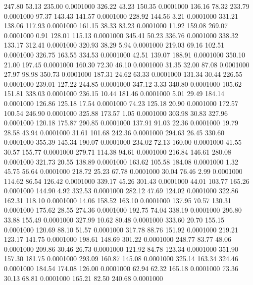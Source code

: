  247.80   53.13  235.00   0.0001000
 326.22   43.23  150.35   0.0001000
 136.16   78.32  233.79   0.0001000
  97.37  143.43  141.57   0.0001000
 228.92  144.56    3.21   0.0001000
 331.21  138.06  117.93   0.0001000
 161.15   38.33   83.23   0.0001000
  11.92  159.08  269.07   0.0001000
   0.91  128.01  115.13   0.0001000
 345.41   50.23  336.76   0.0001000
 338.32  133.17  312.41   0.0001000
 320.93   38.29    5.94   0.0001000
 219.03   69.16  102.51   0.0001000
 326.75  163.55  334.53   0.0001000
  42.51  139.07  188.91   0.0001000
 350.10   21.00  197.45   0.0001000
 160.30   72.30   46.10   0.0001000
  31.35   32.00   87.08   0.0001000
  27.97   98.98  350.73   0.0001000
 187.31   24.62   63.33   0.0001000
 131.34   30.44  226.55   0.0001000
 239.01  127.22  244.85   0.0001000
 347.12    3.33  340.80   0.0001000
 105.62  151.81  338.03   0.0001000
 236.15   10.44  181.46   0.0001000
   5.01   29.49  184.14   0.0001000
 126.86  125.18   17.54   0.0001000
  74.23  125.18   20.90   0.0001000
 172.57  100.54  246.90   0.0001000
 325.88  173.57    1.05   0.0001000
 303.98   30.83  327.96   0.0001000
 120.18  175.87  290.85   0.0001000
 137.91   91.03   22.36   0.0001000
  19.79   28.58   43.94   0.0001000
  31.61  101.68  242.36   0.0001000
 294.63   26.45  330.60   0.0001000
 355.39  145.34  190.07   0.0001000
 234.02   72.13  160.00   0.0001000
  41.55   30.57  155.77   0.0001000
 279.71  114.38   94.61   0.0001000
 216.84  146.61  280.08   0.0001000
 321.73   20.55  138.89   0.0001000
 163.62  105.58  184.08   0.0001000
   1.32   45.75   56.64   0.0001000
 218.72   25.23   67.78   0.0001000
  30.04   76.46    2.99   0.0001000
 114.62   86.54  126.42   0.0001000
 339.17   45.26  301.43   0.0001000
  44.01  103.77  165.26   0.0001000
 144.90    4.92  332.53   0.0001000
 282.12   47.69  124.02   0.0001000
 322.86  162.31  118.10   0.0001000
  14.06  158.52  163.10   0.0001000
 137.95   70.57  130.31   0.0001000
 175.62   28.55  274.36   0.0001000
 192.75   74.04  338.19   0.0001000
 296.80   33.88  155.49   0.0001000
 327.99   10.62   80.48   0.0001000
 333.60   20.70  155.15   0.0001000
 120.69   88.10   51.57   0.0001000
 317.78   88.76  151.92   0.0001000
 219.21  123.17  141.75   0.0001000
 198.61  148.69  301.22   0.0001000
 248.77   83.77   48.06   0.0001000
 209.86   30.46   26.73   0.0001000
 121.92   84.78  123.34   0.0001000
 351.90  157.30  181.75   0.0001000
 293.09  160.87  145.08   0.0001000
 325.14  163.34  324.46   0.0001000
 184.54  174.08  126.00   0.0001000
  62.94   62.32  165.18   0.0001000
  73.36   30.13   68.81   0.0001000
 165.21   82.50  240.68   0.0001000

